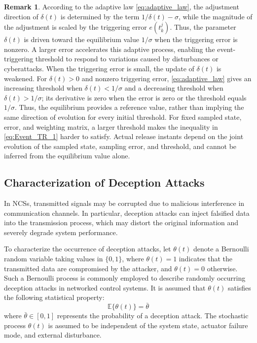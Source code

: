\documentclass[preprint,review,fleqn,sort&compress,3p]{elsarticle}
\theoremstyle{definition} %
\theoremstyle{definition}%
\newtheorem{rem}{Remark}[section]
\begin{document}
\begin{rem}
	According to the adaptive law \eqref{eq:adaptive_law}, the adjustment direction of $\delta(t)$ is determined by the term $1/\delta(t)-\sigma$, while the magnitude of the adjustment is scaled by the triggering error $e(t^j_k)$. Thus, the parameter $\delta(t)$ is driven toward the equilibrium value $1/\sigma$ when the triggering error is nonzero. A larger error accelerates this adaptive process, enabling the event-triggering threshold to respond to variations caused by disturbances or cyberattacks. When the triggering error is small, the update of $\delta(t)$ is weakened. For $\delta(t)>0$ and nonzero triggering error, \eqref{eq:adaptive_law} gives an increasing threshold when $\delta(t)<1/\sigma$ and a decreasing threshold when $\delta(t)>1/\sigma$; its derivative is zero when the error is zero or the threshold equals $1/\sigma$. Thus, the equilibrium provides a reference value, rather than implying the same direction of evolution for every initial threshold. For fixed sampled state, error, and weighting matrix, a larger threshold makes the inequality in \eqref{eq:Event_TR_1} harder to satisfy. Actual release instants depend on the joint evolution of the sampled state, sampling error, and threshold, and cannot be inferred from the equilibrium value alone.
\end{rem}

\subsection{Characterization of Deception Attacks}\label{sec2.3}
In NCSs, transmitted signals may be corrupted due to malicious interference in communication channels. In particular, deception attacks can inject falsified data into the transmission process, which may distort the original information and severely degrade system performance.

To characterize the occurrence of deception attacks, let $\theta(t)$ denote a Bernoulli random variable taking values in $\{0,1\}$, where $\theta(t)=1$ indicates that the transmitted data are compromised by the attacker, and $\theta(t) = 0$ otherwise. Such a Bernoulli process is commonly employed to describe randomly occurring deception attacks in networked control systems. It is assumed that $\theta(t)$ satisfies the following statistical property:
\begin{equation}
	\mathbb{E}\{\theta(t)\} = \bar{\theta} 
\end{equation}
where $\bar{\theta} \in [0,1]$ represents the probability of a deception attack.
The stochastic process $\theta(t)$ is assumed to be independent of the system state, actuator failure mode, and external disturbance.
\end{document}
